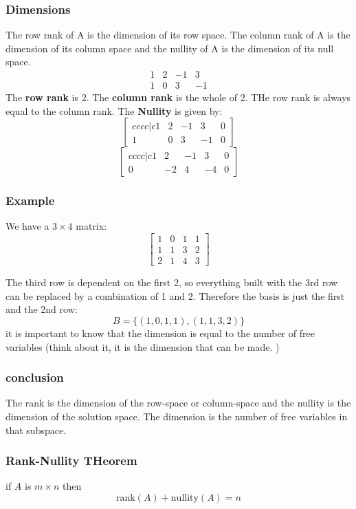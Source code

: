 \documentclass[11pt]{book}
\begin{document}
{{\subsubsection{Dimensions}
\par{The row rank of A is the dimension of its row space. The column rank of A is the dimension of its column space and the nullity of A is the dimension of its null space. \[
\begin{matrix}
	1 & 2 & -1 & 3 \\
	1 & 0 & 3 & -1
\end{matrix}
\] The \textbf{row rank} is 2. The \textbf{column rank} is the whole of 2. THe row rank is always equal to the column rank. The \textbf{Nullity} is given by: \[
\left[
	\begin{matrix}{cccc|c}
	1 & 2 & -1 & 3 & 0\\
	1 & 0 & 3 & -1 & 0
\end{matrix}
\right]
\] \[
\left[
\begin{matrix}{cccc|c}
	1 & 2 & -1 & 3 & 0 \\
	0 & -2 & 4 & -4 & 0
\end{matrix}
\right]
\] }
\subsubsection{Example}
\par{We have a $3\times4$ matrix: } 
\[
\left[
	\begin{matrix}
		1 & 0 & 1 & 1 \\
		1 & 1 & 3 & 2 \\
		2 & 1 & 4 & 3 
	\end{matrix}
\right]
\]
\par{The third row is dependent on the first 2, so everything built with the 3rd row can be replaced by a combination of 1 and 2. Therefore the basis is just the first and the 2nd row: \[
B=\lbrace\left(1,0,1,1\right),\left(1,1,3,2\right)\rbrace
\] it is important to know that the dimension is equal to the number of free variables (think about it, it is the dimension that can be made. ) }
\subsubsection{conclusion}
\par{The rank is the dimension of the row-space or column-space and the nullity is the dimension of the solution space. The dimension is the number of free variables in that subspace.}
\subsubsection{Rank-Nullity THeorem}
\par{if $A$ is  $m\times n$ then  \[
\mathrm{rank}\left(A\right)+\mathrm{nullity}\left(A\right)=n
\] }
}}
\end{document}
